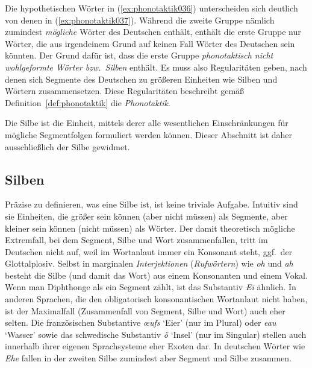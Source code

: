 Die hypothetischen Wörter in (\ref{ex:phonotaktik036}) unterscheiden sich deutlich von denen in (\ref{ex:phonotaktik037}).
Während die zweite Gruppe nämlich zumindest \textit{mögliche} Wörter des Deutschen enthält, enthält die erste Gruppe nur Wörter, die aus irgendeinem Grund auf keinen Fall Wörter des Deutschen sein könnten.
Der Grund dafür ist, dass die erste Gruppe \textit{phonotaktisch nicht wohlgeformte Wörter bzw.\ Silben} enthält.
Es muss also Regularitäten geben, nach denen sich Segmente des Deutschen zu größeren Einheiten wie Silben und Wörtern zusammensetzen.
Diese Regularitäten beschreibt gemäß Definition~\ref{def:phonotaktik} die \textit{Phonotaktik}.


Die Silbe ist die Einheit, mittels derer alle wesentlichen Einschränkungen für mögliche Segmentfolgen formuliert werden können.
Dieser Abschnitt ist daher ausschließlich der Silbe gewidmet.

\subsection{Silben}
\label{sec:silben}


Präzise zu definieren, was eine Silbe ist, ist keine triviale Aufgabe.
Intuitiv sind sie Einheiten, die größer sein können (aber nicht müssen) als Segmente, aber kleiner sein können (nicht müssen) als Wörter.
Der damit theoretisch mögliche Extremfall, bei dem Segment, Silbe und Wort zusammenfallen, tritt im Deutschen nicht auf, weil im Wortanlaut immer ein Konsonant steht, ggf.\ der Glottalplosiv.
Selbst in marginalen \textit{Interjektionen} (\textit{Rufwörtern}) wie \textit{oh} \textipa{[Po:]} und \textit{ah} \textipa{[Pa:]} besteht die Silbe (und damit das Wort) aus einem Konsonanten und einem Vokal.
Wenn man Diphthonge als ein Segment zählt, ist das Substantiv \textit{Ei} \textipa{[P\t{aE}]} ähnlich.
In anderen Sprachen, die den obligatorisch konsonantischen Wortanlaut nicht haben, ist der Maximalfall (Zusammenfall von Segment, Silbe und Wort) auch eher selten.
Die französischen Substantive \textit{œufs} \textipa{[\o:]} `Eier' (nur im Plural) oder \textit{eau} \textipa{[o:]} `Wasser' sowie das schwedische Substantiv \textit{ö} \textipa{[\oe:]} `Insel' (nur im Singular) stellen auch innerhalb ihrer eigenen Sprachsysteme eher Exoten dar.
In deutschen Wörter wie \textit{Ehe} \textipa{[Pe:@]} fallen in der zweiten Silbe zumindest aber Segment und Silbe \textipa{[@]} zusammen.

